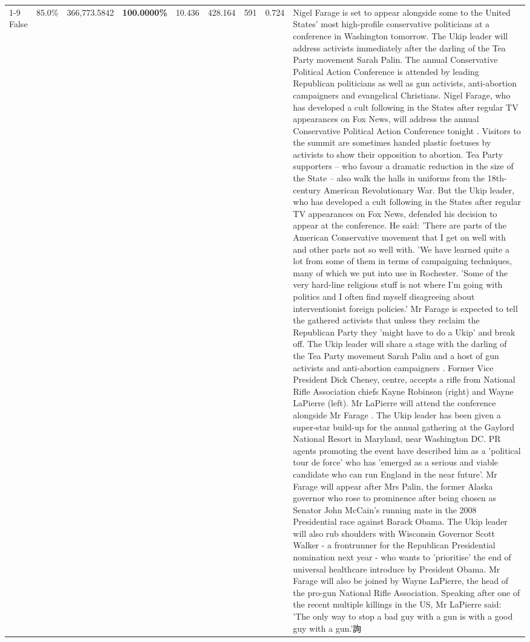 \begin{table}[H]
\begin{tabular}{lllrlllll}
\cline{1-9}
False & 85.0\% & 366,773.5842 & \bfseries \color{red} 100.0000\% & 10.436 & 428.164 & 591 & 0.724 & Nigel Farage is set to appear alongside some to the United States' most high-profile conservative politicians at a conference in Washington tomorrow. The Ukip leader will address activists immediately after the darling of the Tea Party movement Sarah Palin. The annual Conservative Political Action Conference is attended by leading Republican politicians as well as gun activists, anti-abortion campaigners and evangelical Christians. Nigel Farage, who has developed a cult following in the States after regular TV appearances on Fox News, will address the annual Conservative Political Action Conference tonight . Visitors to the summit are sometimes handed plastic foetuses by activists to show their opposition to abortion. Tea Party supporters – who favour a dramatic reduction in the size of the State – also walk the halls in uniforms from the 18th-century American Revolutionary War. But the Ukip leader, who has developed a cult following in the States after regular TV appearances on Fox News, defended his decision to appear at the conference. He said: 'There are parts of the American Conservative movement that I get on well with and other parts not so well with. 'We have learned quite a lot from some of them in terms of campaigning techniques, many of which we put into use in Rochester. 'Some of the very hard-line religious stuff is not where I'm going with politics and I often find myself disagreeing about interventionist foreign policies.' Mr Farage is expected to tell the gathered activists that unless they reclaim the Republican Party they 'might have to do a Ukip' and break off. The Ukip leader will share a stage with the darling of the Tea Party movement Sarah Palin and a host of gun activists and anti-abortion campaigners . Former Vice President Dick Cheney, centre, accepts a rifle from National Rifle Association chiefs Kayne Robinson (right) and Wayne LaPierre (left). Mr LaPierre will attend the conference alongside Mr Farage . The Ukip leader has been given a super-star build-up for the annual gathering at the Gaylord National Resort in Maryland, near Washington DC. PR agents promoting the event have described him as a 'political tour de force' who has 'emerged as a serious and viable candidate who can run England in the near future'. Mr Farage will appear after Mrs Palin, the former Alaska governor who rose to prominence after being chosen as Senator John McCain's running mate in the 2008 Presidential race against Barack Obama. The Ukip leader will also rub shoulders with Wisconsin Governor Scott Walker - a frontrunner for the Republican Presidential nomination next year - who wants to 'prioritise' the end of universal healthcare introduce by President Obama. Mr Farage will also be joined by Wayne LaPierre, the head of the pro-gun National Rifle Association. Speaking after one of the recent multiple killings in the US, Mr LaPierre said: 'The only way to stop a bad guy with a gun is with a good guy with a gun.'詢 \\

\end{tabular}
\end{table}
